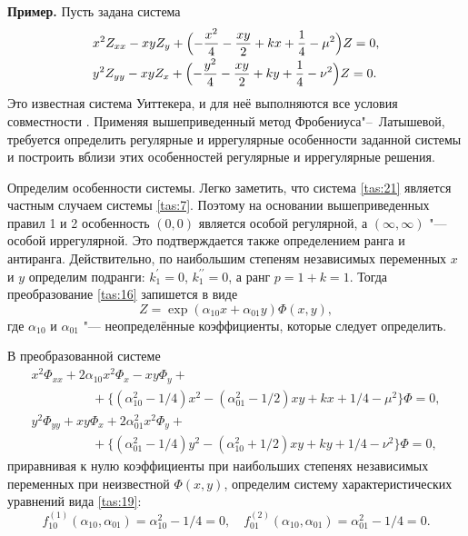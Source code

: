 \textbf {Пример.} Пусть задана система
\begin{equation}
\begin{array}{l}
\displaystyle
x^{2}   Z_{xx}-xy   Z_{y}+\Bigl(-
\frac{x^{2}}{4}-\frac{xy}{2}+k   x+\frac{1}{4}-\mu^{2}
\Bigr)   Z=0, \\[0.2cm]
\displaystyle
y^{2}   Z_{yy}-xy   Z_{x}+\Bigl(- \frac{y^{2}}{4}-\frac{xy}{2}+k   y+\frac{1}{4}-\nu^{2}
\Bigr)   Z=0.
\end{array}
\label{tas:21}
\end{equation}
Это известная система Уиттекера, и для неё выполняются все условия совместности \cite{tas:bib:5}. Применяя вышеприведенный метод Фробениуса"--~Латышевой, требуется определить регулярные и иррегулярные особенности заданной системы и построить вблизи этих особенностей регулярные и иррегулярные решения.

Определим особенности системы. Легко заметить, что система \eqref{tas:21} является частным случаем системы \eqref{tas:7}. 
Поэтому на основании вышеприведенных правил 1 и 2 особенность $(0, 0)$ является особой регулярной, а $(\infty,\infty)$ "--- особой иррегулярной. 
Это подтверждается также определением ранга и антиранга.
Действительно, по наибольшим степеням независимых переменных $x$ и $y$ определим подранги: $k_{1}^{\prime}=0$, $k_{1}^{\prime\prime}=0$, а ранг $p=1+k=1$. 
Тогда преобразование \eqref{tas:16} запишется в виде
\begin{equation}
Z=\exp(\alpha_{10}   x+\alpha_{01}   y)   \Phi(x,y),
\label{tas:22}
\end{equation}
где $\alpha_{10}$ и $\alpha_{01}$ "--- неопределённые коэффициенты, которые следует определить.

В преобразованной системе
\begin{equation}
\begin{array}{l}
x^{2}\Phi_{xx}+2\alpha_{10}x^{2}   \Phi_{x}-xy  
\Phi_{y}+
\\
\hspace{2cm}
\displaystyle
+\bigl\{
(\alpha_{10}^{2}- {1}/{4})   x^{2}-
(\alpha_{01}^{2}- {1}/{2})xy+kx+
{1}/{4}-\mu^{2} \bigr\}   \Phi=0, \\[0.2cm]
y^{2}\Phi_{yy}+xy   \Phi_{x}+2\alpha_{01}^{2}x^{2}   
\Phi_{y}+
\\
\hspace{2cm}
\displaystyle
+\bigl\{
(\alpha_{01}^{2}-{1}/{4})  y^{2}-
(\alpha_{10}^{2}+{1}/{2})xy+
ky+{1}/{4}-\nu^{2} \bigr\}   \Phi=0,
\end{array}
\label{tas:23}
\end{equation}
приравнивая к нулю коэффициенты при наибольших степенях
независимых переменных при неизвестной $\Phi(x,y)$, определим
систему характеристических уравнений вида \eqref{tas:19}:
\begin{equation}
f_{10}^{(1)}(\alpha_{10},\alpha_{01})=\alpha_{10}^{2}-\displaystyle
{1}/{4}=0, \quad 
f_{01}^{(2)}(\alpha_{10},\alpha_{01})=\alpha_{01}^{2}-\displaystyle
{1}/{4}=0.
\label{tas:24}
\end{equation}

